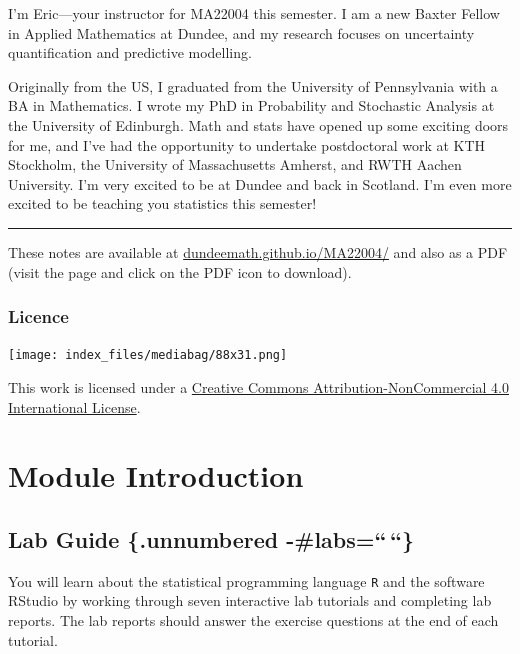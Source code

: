 \documentclass[
  a4paper,
  oneside]{book}
\theoremstyle{definition}
\theoremstyle{definition}
\theoremstyle{definition}
\theoremstyle{plain}
\theoremstyle{remark}
\begin{document}
I'm Eric---your instructor for MA22004 this semester. I am a new Baxter
Fellow in Applied Mathematics at Dundee, and my research focuses on
uncertainty quantification and predictive modelling.

Originally from the US, I graduated from the University of Pennsylvania
with a BA in Mathematics. I wrote my PhD in Probability and Stochastic
Analysis at the University of Edinburgh. Math and stats have opened up
some exciting doors for me, and I've had the opportunity to undertake
postdoctoral work at KTH Stockholm, the University of Massachusetts
Amherst, and RWTH Aachen University. I'm very excited to be at Dundee
and back in Scotland. I'm even more excited to be teaching you
statistics this semester!

\begin{center}\rule{0.5\linewidth}{0.5pt}\end{center}

These notes are available at
\href{https://dundeemath.github.io/MA22004/}{dundeemath.github.io/MA22004/}
and also as a PDF (visit the page and click on the PDF icon to
download).

\section*{Licence}\label{licence}


\texttt{[image: index\_files/mediabag/88x31.png]}

This work is licensed under a
\href{http://creativecommons.org/licenses/by-nc/4.0/}{Creative Commons
Attribution-NonCommercial 4.0 International License}.

\part{Module Introduction}

\chapter*{Lab Guide \{.unnumbered
-\#labs=``\,``\}}\label{lab-guide-.unnumbered--labs}


You will learn about the statistical programming language \texttt{R} and
the software RStudio by working through seven interactive lab tutorials
and completing lab reports. The lab reports should answer the exercise
questions at the end of each tutorial.
\end{document}
